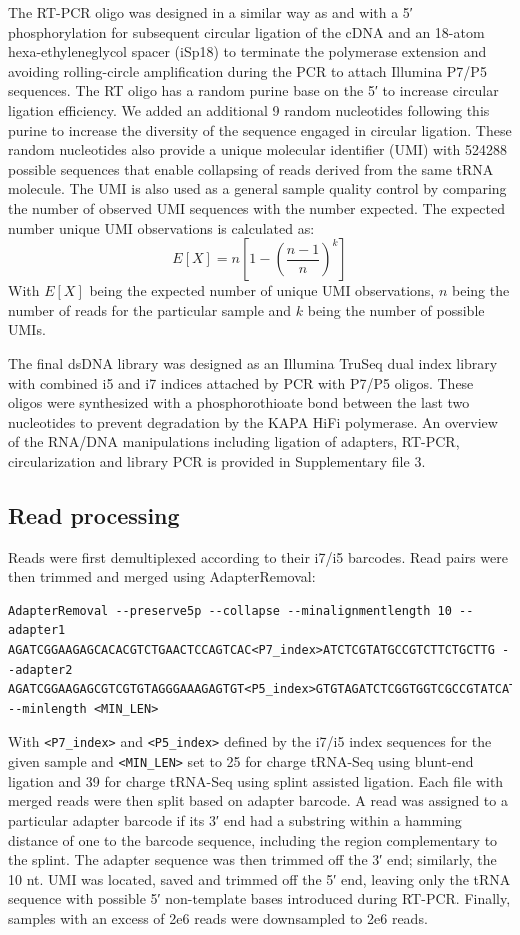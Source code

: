 \documentclass[9pt,lineno]{elife}
\begin{document}
The RT-PCR oligo was designed in a similar way as \cite{McGlincy2017-ro} and \cite{Behrens2021-gb} with a 5′ phosphorylation for subsequent circular ligation of the cDNA and an 18-atom hexa-ethyleneglycol spacer (iSp18) to terminate the polymerase extension and avoiding rolling-circle amplification during the PCR to attach Illumina P7/P5 sequences.
The RT oligo has a random purine base on the 5′ to increase circular ligation efficiency.
We added an additional 9 random nucleotides following this purine to increase the diversity of the sequence engaged in circular ligation.
These random nucleotides also provide a unique molecular identifier (UMI) with 524288 possible sequences that enable collapsing of reads derived from the same tRNA molecule.
The UMI is also used as a general sample quality control by comparing the number of observed UMI sequences with the number expected.
The expected number unique UMI observations is calculated as:
\begin{equation}
E[X] = n \left[ 1 - \left(\frac{n-1}{n} \right)^k \right]
\end{equation}
With $E[X]$ being the expected number of unique UMI observations, $n$ being the number of reads for the particular sample and $k$ being the number of possible UMIs.

The final dsDNA library was designed as an Illumina TruSeq dual index library with combined i5 and i7 indices attached by PCR with P7/P5 oligos.
These oligos were synthesized with a phosphorothioate bond between the last two nucleotides to prevent degradation by the KAPA HiFi polymerase.
An overview of the RNA/DNA manipulations including ligation of adapters, RT-PCR, circularization and library PCR is provided in Supplementary file 3.



\subsection{Read processing}
Reads were first demultiplexed according to their i7/i5 barcodes.
Read pairs were then trimmed and merged using AdapterRemoval:
\begin{lstlisting}
AdapterRemoval --preserve5p --collapse --minalignmentlength 10 --adapter1 AGATCGGAAGAGCACACGTCTGAACTCCAGTCAC<P7_index>ATCTCGTATGCCGTCTTCTGCTTG --adapter2 AGATCGGAAGAGCGTCGTGTAGGGAAAGAGTGT<P5_index>GTGTAGATCTCGGTGGTCGCCGTATCATT --minlength <MIN_LEN>
\end{lstlisting}
With \verb|<P7_index>| and \verb|<P5_index>| defined by the i7/i5 index sequences for the given sample and \verb|<MIN_LEN>| set to 25 for charge tRNA-Seq using blunt-end ligation and 39 for charge tRNA-Seq using splint assisted ligation.
Each file with merged reads were then split based on adapter barcode.
A read was assigned to a particular adapter barcode if its 3′ end had a substring within a hamming distance of one to the barcode sequence, including the region complementary to the splint.
The adapter sequence was then trimmed off the 3′ end; similarly, the 10 nt. UMI was located, saved and trimmed off the 5′ end, leaving only the tRNA sequence with possible 5′ non-template bases introduced during RT-PCR.
Finally, samples with an excess of 2e6 reads were downsampled to 2e6 reads.
\end{document}
